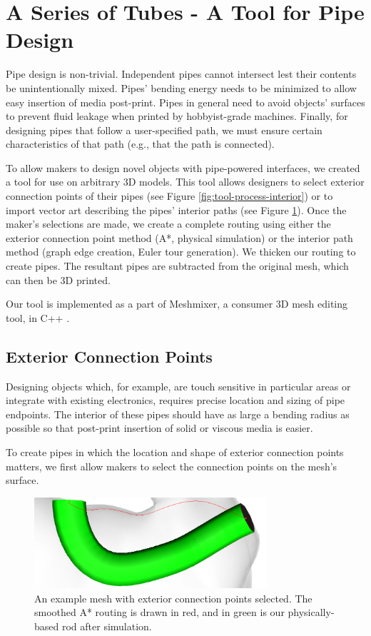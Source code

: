 \section{A Series of Tubes - A Tool for Pipe Design}

Pipe design is non-trivial.  Independent pipes cannot intersect lest their contents be unintentionally mixed.  Pipes' bending energy needs to be minimized to allow easy insertion of media post-print.  Pipes in general need to avoid objects' surfaces to prevent fluid leakage when printed by hobbyist-grade machines.  Finally, for designing pipes that follow a user-specified path, we must ensure certain characteristics of that path (e.g., that the path is connected).

To allow makers to design novel objects with pipe-powered interfaces, we created a tool for use on arbitrary 3D models.  This tool allows designers to select exterior connection points of their pipes (see Figure \ref{fig:tool-process-interior}) or to import vector art describing the pipes' interior paths (see Figure \ref{fig:tool-process-exterior}).  Once the maker's selections are made, we create a complete routing using either the exterior connection point method (A*, physical simulation) or the interior path method (graph edge creation, Euler tour generation).  We thicken our routing to create pipes.  The resultant pipes are subtracted from the original mesh, which can then be 3D printed.

Our tool is implemented as a part of Meshmixer, a consumer 3D mesh editing tool, in C++ \cite{Schmidt-meshmixer}.

\subsection{Exterior Connection Points}

Designing objects which, for example, are touch sensitive in particular areas or integrate with existing electronics, requires precise location and sizing of pipe endpoints.  The interior of these pipes should have as large a bending radius as possible so that post-print insertion of solid or viscous media is easier.

To create pipes in which the location and shape of exterior connection points matters, we first allow makers to select the connection points on the mesh's surface.

\begin{figure}[h!]
\centering
    \includegraphics[width=3.4in]{figures/exterior.png}
\caption{An example mesh with exterior connection points selected.  The smoothed A* routing is drawn in {\color{red}red}, and in {\color{tovi}green} is our physically-based rod after simulation.}
\label{fig:tool-process-exterior}
\end{figure}


